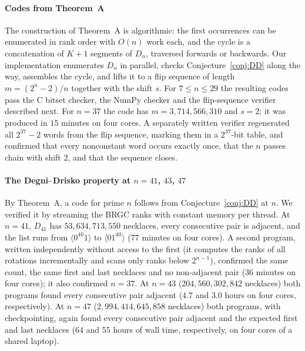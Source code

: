\documentclass[journal,onecolumn,11pt]{IEEEtran}
\begin{document}
\paragraph{Codes from Theorem~A} The construction of Theorem~A is algorithmic: the first occurrences can be
enumerated in rank order with $O(n)$ work each, and the cycle is a concatenation of $K+1$ segments of $D_n$, traversed
forwards or backwards. Our implementation enumerates $D_n$ in parallel, checks Conjecture~\ref{conj:DD} along the way,
assembles the cycle, and lifts it to a flip sequence of length $m=(2^n-2)/n$ together with the shift $s$. For
$7\le n\le29$ the resulting codes pass the C bitset checker, the NumPy checker and the flip-sequence verifier described
next. For $n=37$ the code has $m=3{,}714{,}566{,}310$ and $s=2$; it
was produced in $15$ minutes on four cores. A separately written verifier regenerated all $2^{37}-2$ words from the
flip sequence, marking them in a $2^{37}$-bit table, and confirmed that every nonconstant word occurs exactly once,
that the $n$ passes chain with shift $2$, and that the sequence closes.

\paragraph{The Degni--Drisko property at $n=41$, $43$, $47$} By Theorem~A, a code for prime $n$ follows from
Conjecture~\ref{conj:DD} at $n$. We verified it by streaming the BRGC ranks with constant memory per thread. At $n=41$,
$D_{41}$ has $53{,}634{,}713{,}550$ necklaces, every consecutive pair is adjacent, and the list runs from
$\langle0^{40}1\rangle$ to $\langle01^{40}\rangle$ ($77$ minutes on four cores). A second program, written
independently without access to the first (it computes the ranks of all rotations incrementally and scans only ranks
below $2^{n-1}$), confirmed the same count, the same first and last necklaces and no non-adjacent pair ($36$ minutes on
four cores); it also confirmed $n=37$. At $n=43$ ($204{,}560{,}302{,}842$ necklaces) both programs found every
consecutive pair adjacent ($4.7$ and $3.0$ hours on four cores, respectively). At $n=47$ ($2{,}994{,}414{,}645{,}858$ necklaces)
both programs, with checkpointing, again found every consecutive pair adjacent and the expected first and last
necklaces ($64$ and $55$ hours of wall time, respectively, on four cores of a shared laptop).
\end{document}
